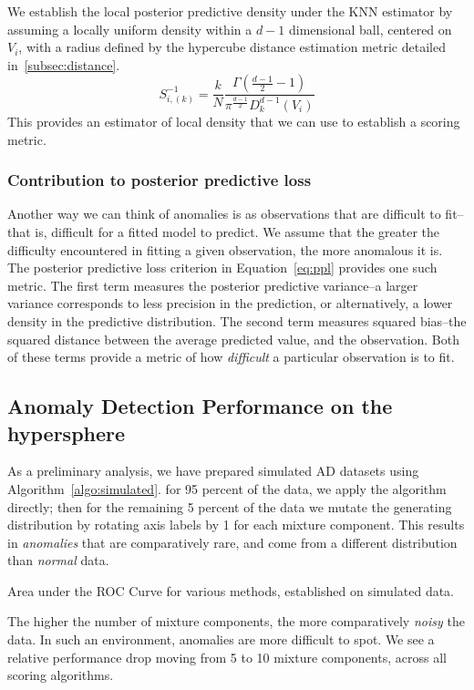 We establish the local posterior predictive density under the KNN estimator by assuming a locally
  uniform density within a $d-1$ dimensional ball, centered on $V_i$, with a radius defined by
  the hypercube distance estimation metric detailed in~\ref{subsec:distance}.
  \begin{equation}
    \label{eqn:ad_knn}
      S_{i,(k)}^{-1} =
        \frac{k}{N}\frac{\Gamma\left(\frac{d-1}{2} - 1\right)}{\pi^{\frac{d-1}{2}}D_{k}^{d-1}(V_i)}
  \end{equation}
  This provides an estimator of local density that we can use to establish a scoring metric.

\subsubsection{Contribution to posterior predictive loss}
Another way we can think of anomalies is as observations that are difficult to fit--that is, difficult
  for a fitted model to predict.  We assume that the greater the difficulty encountered in fitting a
  given observation, the more anomalous it is.  The posterior predictive loss criterion in
  Equation~\ref{eq:ppl} provides one such metric.  The first term measures the posterior predictive
  variance--a larger variance corresponds to less precision in the prediction, or alternatively, a lower
  density in the predictive distribution.  The second term measures squared bias--the squared distance
  between the average predicted value, and the observation.  Both of these terms provide a metric of
  how \emph{difficult} a particular observation is to fit.

\subsection{Anomaly Detection Performance on the hypersphere}
As a preliminary analysis, we have prepared simulated AD datasets using Algorithm~\ref{algo:simulated}.
  for 95 percent of the data, we apply the algorithm directly; then for the remaining 5 percent of the
  data we mutate the generating distribution by rotating axis labels by 1 for each mixture component.
  This results in \emph{anomalies} that are comparatively rare, and come from a different distribution
  than \emph{normal} data.

\begin{table}[h]
  \centering
  \label{tab:ad_sim_results}
  
  \caption{Area under the ROC Curve for various methods, established on simulated data.}
\end{table}

The higher the number of mixture components, the more comparatively \emph{noisy} the data.  In such
  an environment, anomalies are more difficult to spot.  We see a relative performance drop moving
  from 5 to 10 mixture components, across all scoring algorithms.





